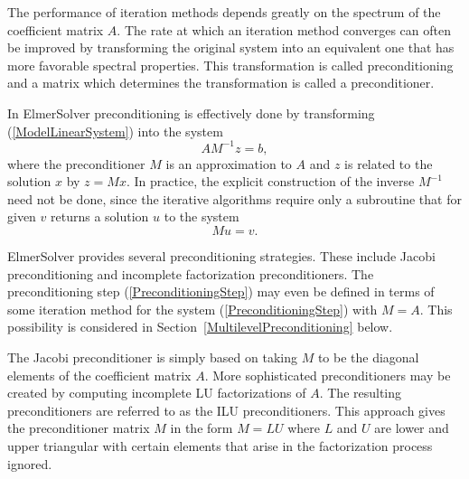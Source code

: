 \begin{versiona}
The performance of iteration methods depends greatly on the spectrum
of the coefficient matrix $A$. The rate at which an iteration method converges
can often be improved by transforming the original system into an equivalent one 
that has more favorable spectral properties. This transformation is called
preconditioning and a matrix which determines the transformation is called 
a preconditioner.  

In ElmerSolver preconditioning is effectively done by transforming (\ref{ModelLinearSystem}) 
into the system
\begin{equation}
AM^{-1} z = b,
\end{equation}
where the preconditioner $M$ is an approximation to $A$ and $z$ is related
to the solution $x$ by $z=Mx$. In practice, the explicit construction of the 
inverse $M^{-1}$ need not be done, since the iterative algorithms require only a subroutine
that for given $v$ returns a solution $u$ to the system  
\begin{equation}\label{PreconditioningStep}
  M u = v.
\end{equation}

ElmerSolver provides several preconditioning strategies.
These include Jacobi preconditioning and
incomplete factorization preconditioners. The preconditioning step
(\ref{PreconditioningStep}) may even be defined in terms of   
some iteration method for the system (\ref{PreconditioningStep}) with
$M=A$. This possibility is considered in Section~\ref{MultilevelPreconditioning} below. 


The Jacobi preconditioner is simply based on taking $M$ to be the diagonal elements of 
the coefficient matrix $A$. More sophisticated preconditioners may be created by
computing incomplete LU factorizations of $A$. The resulting preconditioners are referred 
to as the ILU preconditioners. This approach gives the 
preconditioner matrix $M$ in the form $M=LU$ where $L$ and $U$ are lower and upper 
triangular with certain elements that arise in the factorization process ignored. 


\end{versiona}
